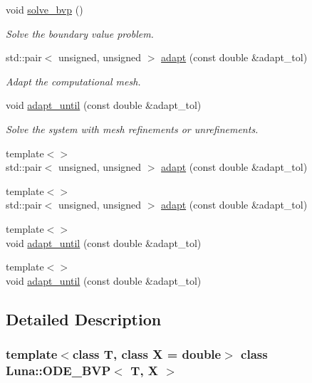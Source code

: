 \begin{DoxyCompactItemize}
void \hyperlink{classLuna_1_1ODE__BVP_ae035272ad664be6ad5334f1b93a86b15}{solve\+\_\+bvp} ()
\begin{DoxyCompactList}\small\item\em Solve the boundary value problem. \end{DoxyCompactList}\item 
std\+::pair$<$ unsigned, unsigned $>$ \hyperlink{classLuna_1_1ODE__BVP_af132e3f1f22a87bd2505c556cd6e0993}{adapt} (const double \&adapt\+\_\+tol)
\begin{DoxyCompactList}\small\item\em Adapt the computational mesh. \end{DoxyCompactList}\item 
void \hyperlink{classLuna_1_1ODE__BVP_a504f92ae04c8ab1ccd2b1ba96c09b79e}{adapt\+\_\+until} (const double \&adapt\+\_\+tol)
\begin{DoxyCompactList}\small\item\em Solve the system with mesh refinements or unrefinements. \end{DoxyCompactList}\item 
{\footnotesize template$<$$>$ }\\std\+::pair$<$ unsigned, unsigned $>$ \hyperlink{classLuna_1_1ODE__BVP_a8da2eba83d2bb58a5e87f77ce3620056}{adapt} (const double \&adapt\+\_\+tol)
\item 
{\footnotesize template$<$$>$ }\\std\+::pair$<$ unsigned, unsigned $>$ \hyperlink{classLuna_1_1ODE__BVP_a59d055c7eb9058184aa86d5514d615e5}{adapt} (const double \&adapt\+\_\+tol)
\item 
{\footnotesize template$<$$>$ }\\void \hyperlink{classLuna_1_1ODE__BVP_a5158d9bd406cfea3eaa7f98f5fc74d44}{adapt\+\_\+until} (const double \&adapt\+\_\+tol)
\item 
{\footnotesize template$<$$>$ }\\void \hyperlink{classLuna_1_1ODE__BVP_a5127af573d557a9640fdff989e9f7e69}{adapt\+\_\+until} (const double \&adapt\+\_\+tol)
\end{DoxyCompactItemize}


\subsection{Detailed Description}
\subsubsection*{template$<$class T, class X = double$>$\newline
class Luna\+::\+O\+D\+E\+\_\+\+B\+V\+P$<$ T, X $>$}

